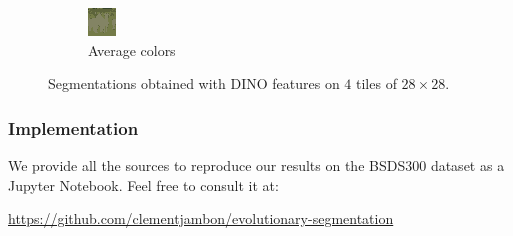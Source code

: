 \documentclass{beamer}
\begin{document}
\begin{frame}
\begin{figure}
\begin{subfigure}[b]{0.16\textwidth}
            \includegraphics[width=\textwidth]{../figures/dino/tile_2/253027_avg.png}
            \caption{Average colors}
        \end{subfigure}
           \caption{Segmentations obtained with DINO features on $4$ tiles of $28\times 28$.}
           \label{fig:results-dino-tile2}
    \end{figure}
\end{frame}

\begin{frame}
    \frametitle{Implementation}
    We provide all the sources to reproduce our results on the BSDS300\cite{bsds300} dataset as a Jupyter Notebook. Feel free to consult it at:
    \begin{center}
        \url{https://github.com/clementjambon/evolutionary-segmentation}
    \end{center}
\end{frame}

\begin{frame}[shrink=30]

  
\end{frame}
  
\end{document}
